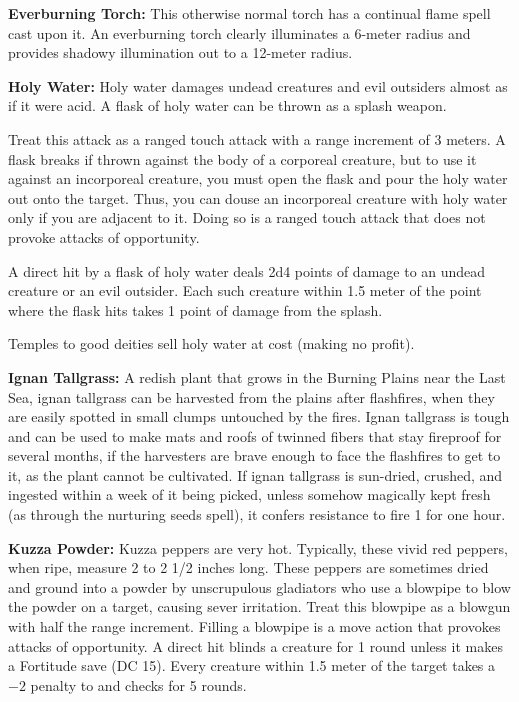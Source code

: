 \textbf{Everburning Torch:} This otherwise normal torch has a continual flame spell cast upon it. An everburning torch clearly illuminates a 6-meter radius and provides shadowy illumination out to a 12-meter radius.

\textbf{Holy Water:} Holy water damages undead creatures and evil outsiders almost as if it were acid. A flask of holy water can be thrown as a splash weapon.

Treat this attack as a ranged touch attack with a range increment of 3 meters. A flask breaks if thrown against the body of a corporeal creature, but to use it against an incorporeal creature, you must open the flask and pour the holy water out onto the target. Thus, you can douse an incorporeal creature with holy water only if you are adjacent to it. Doing so is a ranged touch attack that does not provoke attacks of opportunity.

A direct hit by a flask of holy water deals 2d4 points of damage to an undead creature or an evil outsider. Each such creature within 1.5 meter of the point where the flask hits takes 1 point of damage from the splash.

Temples to good deities sell holy water at cost (making no profit).

\textbf{Ignan Tallgrass:} A redish plant that grows in the Burning Plains near the Last Sea, ignan tallgrass can be harvested from the plains after flashfires, when they are easily spotted in small clumps untouched by the fires. Ignan tallgrass is tough and can be used to make mats and roofs of twinned fibers that stay fireproof for several months, if the harvesters are brave enough to face the flashfires to get to it, as the plant cannot be cultivated. If ignan tallgrass is sun-dried, crushed, and ingested within a week of it being picked, unless somehow magically kept fresh (as through the nurturing seeds spell), it confers resistance to fire 1 for one hour.

\textbf{Kuzza Powder:} Kuzza peppers are very hot. Typically, these vivid red peppers, when ripe, measure 2 to 2 1/2 inches long. These peppers are sometimes dried and ground into a powder by unscrupulous gladiators who use a blowpipe to blow the powder on a target, causing sever irritation. Treat this blowpipe as a blowgun with half the range increment. Filling a blowpipe is a move action that provokes attacks of opportunity. A direct hit blinds a creature for 1 round unless it makes a Fortitude save (DC 15). Every creature within 1.5 meter of the target takes a $-2$ penalty to  and  checks for 5 rounds.

